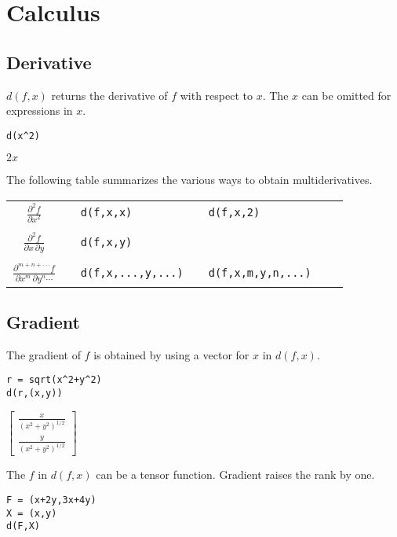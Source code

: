 
\section{Calculus}
\subsection{Derivative}
$d(f,x)$ returns the derivative of $f$ with respect to $x$.
The $x$ can be omitted for expressions in $x$.

\begin{Verbatim}[formatcom=\color{blue},samepage=true]
d(x^2)
\end{Verbatim}

$\displaystyle 2x$

The following table summarizes the various ways to obtain multiderivatives.

\begin{center}
\begin{tabular}{cllllll}
$\displaystyle{\frac{\partial^2f}{\partial x^2}}$ & & \verb$d(f,x,x)$ & & \verb$d(f,x,2)$ \\
\\
$\displaystyle{\frac{\partial^2f}{\partial x\,\partial y}}$ & & \verb$d(f,x,y)$ \\
\\
$\displaystyle{\frac{\partial^{m+n+\cdot\cdot\cdot} f}{\partial x^m\,\partial y^n\cdots}}$ & &
\verb$d(f,x,...,y,...)$ & & \verb$d(f,x,m,y,n,...)$ \\
\end{tabular}
\end{center}

\subsection{Gradient}
The gradient of $f$ is obtained by using a vector for $x$ in $d(f,x)$.

\begin{Verbatim}[formatcom=\color{blue},samepage=true]
r = sqrt(x^2+y^2)
d(r,(x,y))
\end{Verbatim}

$\displaystyle \begin{bmatrix}\frac{x}{(x^2+y^2)^{1/2}}\\ \frac{y}{(x^2+y^2)^{1/2}}\end{bmatrix}$

The $f$ in $d(f,x)$ can be a tensor function.
Gradient raises the rank by one.

\begin{Verbatim}[formatcom=\color{blue},samepage=true]
F = (x+2y,3x+4y)
X = (x,y)
d(F,X)
\end{Verbatim}

